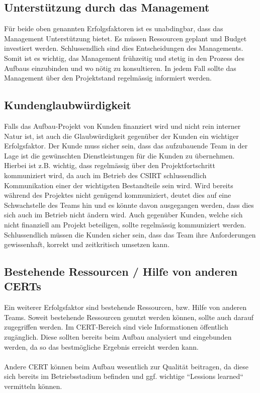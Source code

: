 \subsection{Unterstützung durch das Management}
Für beide oben genannten Erfolgsfaktoren ist es unabdingbar, dass das Management Unterstützung bietet. Es müssen Ressourcen geplant und Budget investiert werden. Schlussendlich sind dies Entscheidungen des Managements. Somit ist es wichtig, das Management frühzeitig und stetig in den Prozess des Aufbaus einzubinden und wo nötig zu konsultieren. In jedem Fall sollte das Management über den Projektstand regelmässig informiert werden. 

\subsection{Kundenglaubwürdigkeit}
Falls das Aufbau-Projekt von Kunden finanziert wird und nicht rein interner Natur ist, ist auch die Glaubwürdigkeit gegenüber der Kunden ein wichtiger Erfolgsfaktor. Der Kunde muss sicher sein, dass das aufzubauende Team in der Lage ist die gewünschten Dienstleistungen für die Kunden zu übernehmen. Hierbei ist z.B. wichtig, dass regelmässig über den Projektfortschritt kommuniziert wird, da auch im Betrieb des CSIRT schlussendlich Kommunikation einer der wichtigsten Bestandteile sein wird. Wird bereits während des Projektes nicht genügend kommuniziert, deutet dies auf eine Schwachstelle des Teams hin und es könnte davon ausgegangen werden, dass dies sich auch im Betrieb nicht ändern wird. Auch gegenüber Kunden, welche sich nicht finanziell am Projekt beteiligen, sollte regelmässig kommuniziert werden. Schlussendlich müssen die Kunden sicher sein, dass das Team ihre Anforderungen gewissenhaft, korrekt und zeitkritisch umsetzen kann.

\subsection{Bestehende Ressourcen / Hilfe von anderen CERTs}
Ein weiterer Erfolgsfaktor sind bestehende Ressourcen, bzw. Hilfe von anderen Teams. Soweit bestehende Ressourcen genutzt werden können, sollte auch darauf zugegriffen werden. Im CERT-Bereich sind viele Informationen öffentlich zugänglich. Diese sollten bereits beim Aufbau analysiert und eingebunden werden, da so das bestmögliche Ergebnis erreicht werden kann. \\
\\
Andere CERT können beim Aufbau wesentlich zur Qualität beitragen, da diese sich bereits im Betriebsstadium befinden und ggf. wichtige ``Lessions learned`` vermitteln können.

